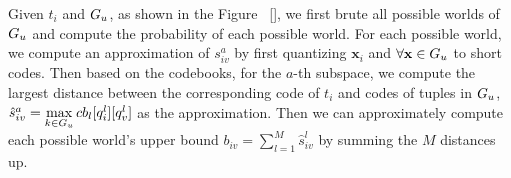 Given $t_i$ and $G_u$, as shown in the Figure ~\ref{}, we first brute all possible worlds of $G_u$ and compute the probability of each possible world. For each possible world, we compute an approximation of $s_{iv}^a$ by first quantizing $\mathbf{x}_i$ and $\forall \mathbf{x} \in G_u$ to short codes. Then based on the codebooks, for the $a$-th subspace, we compute the largest distance between the corresponding code of $t_i$ and codes of tuples in $G_u$, \ie $\hat{s}^a_{iv} = \max\limits_{k\in G_u}cb_l[q_i^l][q_v^l]$ as the approximation. Then we can approximately compute each possible world's upper bound $b_{iv}=\sum_{l=1}^{M}\hat{s}^l_{iv}$ by summing the $M$ distances up.  